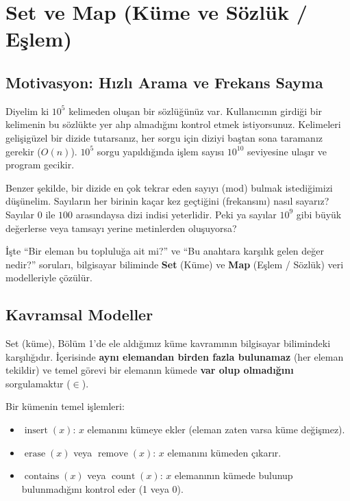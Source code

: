 \section{Set ve Map (Küme ve Sözlük / Eşlem)}

\subsection{Motivasyon: Hızlı Arama ve Frekans Sayma}
Diyelim ki $10^5$ kelimeden oluşan bir sözlüğünüz var. Kullanıcının girdiği bir kelimenin bu sözlükte yer alıp almadığını kontrol etmek istiyorsunuz. Kelimeleri gelişigüzel bir dizide tutarsanız, her sorgu için diziyi baştan sona taramanız gerekir ($O(n)$). $10^5$ sorgu yapıldığında işlem sayısı $10^{10}$ seviyesine ulaşır ve program gecikir.

Benzer şekilde, bir dizide en çok tekrar eden sayıyı (mod) bulmak istediğimizi düşünelim. Sayıların her birinin kaçar kez geçtiğini (frekansını) nasıl sayarız? Sayılar $0$ ile $100$ arasındaysa dizi indisi yeterlidir. Peki ya sayılar $10^9$ gibi büyük değerlerse veya tamsayı yerine metinlerden oluşuyorsa? 

İşte ``Bir eleman bu topluluğa ait mi?'' ve ``Bu anahtara karşılık gelen değer nedir?'' soruları, bilgisayar biliminde \textbf{Set} (Küme) ve \textbf{Map} (Eşlem / Sözlük) veri modelleriyle çözülür.

\subsection{Kavramsal Modeller}

\begin{definition}
Set (küme), Bölüm 1'de ele aldığımız küme kavramının bilgisayar bilimindeki karşılığıdır. İçerisinde \textbf{aynı elemandan birden fazla bulunamaz} (her eleman tekildir) ve temel görevi bir elemanın kümede \textbf{var olup olmadığını} sorgulamaktır ($\in$).
\end{definition}

Bir kümenin temel işlemleri:
\begin{itemize}
    \item $\operatorname{insert}(x)$: $x$ elemanını kümeye ekler (eleman zaten varsa küme değişmez).
    \item $\operatorname{erase}(x)$ veya $\operatorname{remove}(x)$: $x$ elemanını kümeden çıkarır.
    \item $\operatorname{contains}(x)$ veya $\operatorname{count}(x)$: $x$ elemanının kümede bulunup bulunmadığını kontrol eder (1 veya 0).
\end{itemize}

